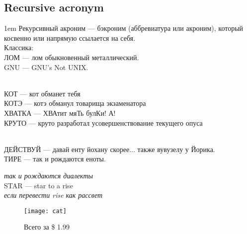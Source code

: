 \subsection{Recursive acronym}
\begin{flushleft}\parskip1em
    Рекурсивный акроним --- бэкроним (аббревиатура или акроним), который косвенно или напрямую ссылается на себя.\\
    Классика:\\
    ЛОМ --- лом обыкновенный металлический.\\
    GNU --- GNU's Not UNIX.

    \emph{}\\
    КОТ --- кот обманет тебя\\
    КОТЭ --- котэ обманул товарища экзаменатора\\
    ХВАТКА --- ХВАтит мяТь булКи! А!\\
    КРУТО --- круто разработал усовершенствование текущего опуса

    \emph{}\\
    ДЕЙСТВУЙ --- давай енту йохану скорее... также вувузелу у Йорика.\\
    ТИРЕ --- так и рождаются еноты.

    \emph{так и рождаются диалекты}\\
    STAR --- star to a rise\\
    \emph{если перевести rise как рассвет}
\end{flushleft}
\begin{figure}[ht!]
    \centering
    \texttt{[image: cat]}
    \caption{Всего за \$ 1.99}
\end{figure}

